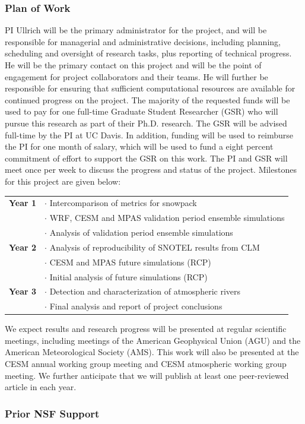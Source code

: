 \documentclass[11pt]{article}
\begin{document}
\subsubsection{Plan of Work}

PI Ullrich will be the primary administrator for the project, and will be responsible for managerial and administrative decisions, including planning, scheduling and oversight of research tasks, plus reporting of technical progress. He will be the primary contact on this project and will be the point of engagement for project collaborators and their teams. He will further be responsible for ensuring that sufficient computational resources are available for continued progress on the project. The majority of the requested funds will be used to pay for one full-time Graduate Student Researcher (GSR) who will pursue this research as part of their Ph.D. research. The GSR will be advised full-time by the PI at UC Davis. In addition, funding will be used to reimburse the PI for one month of salary, which will be used to fund a eight percent commitment of effort to support the GSR on this work. The PI and GSR will meet once per week to discuss the progress and status of the project. Milestones for this project are given below:

\begin{tabularx}{\textwidth}{cX}
\hline
\textbf{Year 1} & $\cdot$ Intercomparison of metrics for snowpack \\
& $\cdot$ WRF, CESM and MPAS validation period ensemble simulations \\
& $\cdot$ Analysis of validation period ensemble simulations \\
\hline
\textbf{Year 2} & $\cdot$ Analysis of reproducibility of SNOTEL results from CLM \\
& $\cdot$ CESM and MPAS future simulations (RCP) \\
& $\cdot$ Initial analysis of future simulations (RCP) \\
\hline
\textbf{Year 3} & $\cdot$ Detection and characterization of atmospheric rivers \\
& $\cdot$ Final analysis and report of project conclusions \\
\hline
\end{tabularx}

We expect results and research progress will be presented at regular scientific meetings, including meetings of the American Geophysical Union (AGU) and the American Meteorological Society (AMS). This work will also be presented at the CESM annual working group meeting and CESM atmospheric working group meeting. We further anticipate that we will publish at least one peer-reviewed article in each year.

\subsubsection{Prior NSF Support}

  
{\vbox{}}
\end{document}
